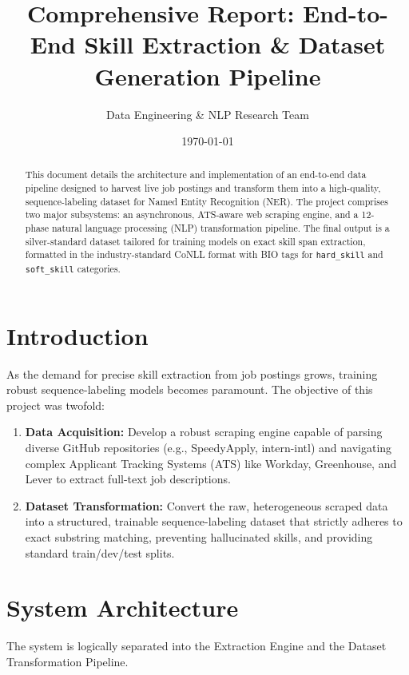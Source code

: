\documentclass[11pt, a4paper]{article}
\title{\textbf{Comprehensive Report: End-to-End Skill Extraction \& Dataset Generation Pipeline}}
\author{Data Engineering \& NLP Research Team}
\date{\today}
\begin{document}
\maketitle

\begin{abstract}
This document details the architecture and implementation of an end-to-end data pipeline designed to harvest live job postings and transform them into a high-quality, sequence-labeling dataset for Named Entity Recognition (NER). The project comprises two major subsystems: an asynchronous, ATS-aware web scraping engine, and a 12-phase natural language processing (NLP) transformation pipeline. The final output is a silver-standard dataset tailored for training models on exact skill span extraction, formatted in the industry-standard CoNLL format with BIO tags for \texttt{hard\_skill} and \texttt{soft\_skill} categories.
\end{abstract}

\tableofcontents
\newpage

\section{Introduction}
As the demand for precise skill extraction from job postings grows, training robust sequence-labeling models becomes paramount. The objective of this project was twofold:
\begin{enumerate}
    \item \textbf{Data Acquisition:} Develop a robust scraping engine capable of parsing diverse GitHub repositories (e.g., SpeedyApply, intern-intl) and navigating complex Applicant Tracking Systems (ATS) like Workday, Greenhouse, and Lever to extract full-text job descriptions.
    \item \textbf{Dataset Transformation:} Convert the raw, heterogeneous scraped data into a structured, trainable sequence-labeling dataset that strictly adheres to exact substring matching, preventing hallucinated skills, and providing standard train/dev/test splits.
\end{enumerate}

\section{System Architecture}

The system is logically separated into the Extraction Engine and the Dataset Transformation Pipeline.
\end{document}

